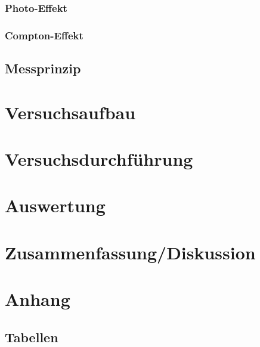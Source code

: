 \documentclass[12pt]{article}
\begin{document}
 \subsubsection{Photo-Effekt}
 
 \subsubsection{Compton-Effekt}
 \subsection{Messprinzip}
\newpage
\section{Versuchsaufbau}


\newpage
\section{Versuchsdurchführung}



\newpage
\section{Auswertung}


\newpage
\section{Zusammenfassung/Diskussion}


\newpage
\section{Anhang}

\subsection{Tabellen}

%


%
\end{document}
